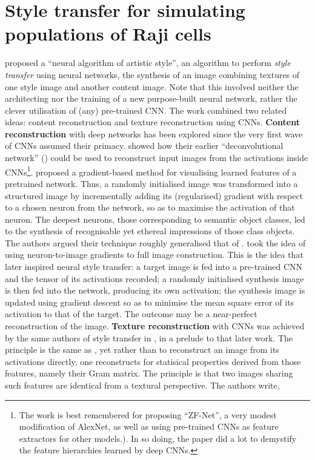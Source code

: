 \section{Style transfer for simulating populations of Raji cells}
\label{subsec:style_transfer_application}

\cite{gatys2016image} proposed a ``neural algorithm of artistic style'', an algorithm to perform \emph{style transfer} using neural networks, the synthesis of an image combining textures of one style image and another content image. Note that this involved neither the architecting nor the training of a new purpose-built neural network, rather the clever utilisation of (any) pre-trained CNN. The work combined two related ideas: content reconstruction and texture reconstruction using CNNs. \textbf{Content reconstruction} with deep networks has been explored since the very first wave of CNNs assumed their primacy. \cite{zeiler2014visualizing} showed how their earlier ``deconvolutional network'' (\cite{zeiler2010deconvolutional}) could be used to reconstruct input images from the activations inside CNNs\footnote{The work is best remembered for proposing ``ZF-Net'', a very modest modification of AlexNet, as well as using pre-trained CNNs as feature extractors for other models.). In so doing, the paper did a lot to demystify the feature hierarchies learned by deep CNNs.}. \cite{simonyan2013deep} proposed a gradient-based method for visualising learned features of a pretrained network. Thus, a randomly initialised image was transformed into a structured image by incrementally adding its (regularised) gradient with respect to a chosen neuron from the network, so as to maximise the activation of that neuron. The deepest neurons, those corresponding to semantic object classes, led to the synthesis of recognisable yet ethereal impressions of those class objects. The authors argued their technique roughly generalised that of \cite{zeiler2014visualizing}. \cite{mahendran2015understanding} took the idea of using neuron-to-image gradients to full image construction. This is the idea that later inspired neural style transfer: a target image is fed into a pre-trained CNN and the tensor of its activations recorded; a randomly initialised synthesis image is then fed into the network, producing its own activation; the synthesis image is updated using gradient descent so as to minimise the mean square error of its activation to that of the target. The outcome may be a near-perfect reconstruction of the image. \textbf{Texture reconstruction} with CNNs was achieved by the same authors of style transfer in \cite{gatys2015texture}, in a prelude to that later work. The principle is the same as \cite{mahendran2015understanding}, yet rather than to reconstruct an image from its activations directly, one reconstructs for statisical properties derived from those features, namely their Gram matrix. The principle is that two images sharing such features are identical from a textural perspective. The authors write,

